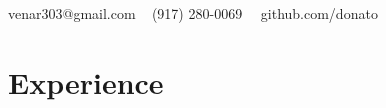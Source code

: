 \documentclass[oneside, final]{scrartcl}
\begin{document}
\begin{center}
 
\textsc{\LARGE{}}\\
\\
{\Large\Letter} venar303@gmail.com \ {\Large\Telefon} (917) 280-0069 \ \faGithub \ github.com/donato

\vspace{-5pt}


\section{Experience}
\begin{comment}
\textsc{Software Engineer \hfill February 2018 - Present\\}
\textsc{Google \hfill New York, NY\\}
\begin{itemize}
	\setlength{\itemsep}{1pt}
	\setlength{\parskip}{0pt}
	\setlength{\parsep}{0pt}
	\setlength{\leftmargin}{-5mm}
	\item Designed and lead global strategy for Ads Transparency across all Connected TV devices including Apple TV, Roku, FireTV and Chromecast.
	\item Oversaw implementation of GDPR compliance for digital Video Advertising, responsible for over 100M ad impressions per day.
	\item Identified, planned and executed major refactor of Sdk, allowing core components to be made immutable.
	\item Adviser to four 8+ engineer teams as part of Googles Tech Immersion program. 
\end{itemize}
\end{comment}


\end{center}
\end{document}
